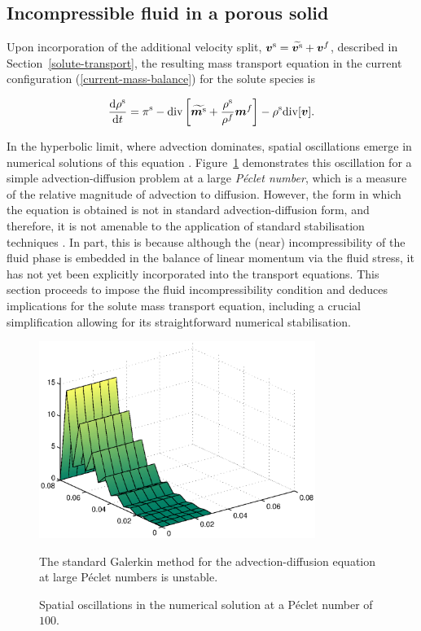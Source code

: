 \subsection{Incompressible fluid in a porous solid}
\label{incompressible-fluid-porous-solid}

Upon incorporation of the additional velocity split,
$\mbox{\boldmath$ v$}^\mathrm{s}=\widetilde{\mbox{\boldmath$ v$}^\mathrm{s}}+\mbox{\boldmath$ v$}^f$, described in
Section~\ref{solute-transport}, the resulting mass transport equation
in the current configuration (\ref{current-mass-balance}) for the
solute species is

\begin{equation}
\frac{\mathrm{d}\rho^\mathrm{s}}{\mathrm{d}t} = \pi^\mathrm{s}-
\mathrm{div} \left[\widetilde{\mbox{\boldmath$ m$}^\mathrm{s}}+
  \frac{\rho^\mathrm{s}}{\rho^f}\mbox{\boldmath$ m$}^f\right] - \rho^\mathrm{s}
\mathrm{div}[\mbox{\boldmath$ v$}].
\label{massbalcurrsol}
\end{equation}

\noindent In the hyperbolic limit, where advection dominates, spatial
oscillations emerge in numerical solutions of this equation
\citep{Brooks:82,Paper6}. Figure~\ref{unstable-solution} demonstrates
this oscillation for a simple advection-diffusion problem at a large
{\em P\'eclet number}, which is a measure of the relative magnitude of
advection to diffusion. However, the form in which the equation is obtained is not in standard
advection-diffusion form, and therefore, it is not amenable to the
application of standard stabilisation techniques \citep{Paper6}. In
part, this is because although the (near) incompressibility of the
fluid phase is embedded in the balance of linear momentum via the
fluid stress, it has not yet been explicitly incorporated into the
transport equations. This section proceeds to impose the fluid
incompressibility condition and deduces implications for the solute
mass transport equation, including a crucial simplification allowing
for its straightforward numerical stabilisation.

\begin{figure}
  \begin{center}
  \includegraphics[width=0.8\textwidth]{images/elucidation/unstable-advection.eps}
  \caption{Spatial oscillations in the numerical solution at a
    P\'eclet number of $100$.}
  \label{unstable-solution}
  \end{center}
  {The standard Galerkin method for the advection-diffusion equation
    at large P\'eclet numbers is unstable.}
\end{figure}

